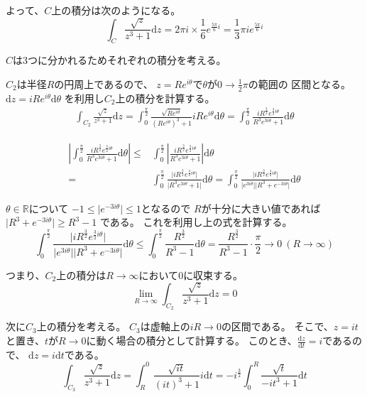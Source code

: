 \documentclass[12pt,b5paper]{ltjsarticle}
\begin{document}
よって、$C$上の積分は次のようになる。
\begin{equation}
 \int_{C} \frac{\sqrt{z}}{z^3+1}\mathrm{d}z
  = 2\pi i \times \frac{1}{6} e^{\frac{5\pi}{6}i}
  = \frac{1}{3} \pi i e^{\frac{5\pi}{6}i}
\end{equation}

$C$は3つに分かれるためそれぞれの積分を考える。

$C_2$は半径$R$の円周上であるので、
$z=Re^{i\theta}$で$\theta$が$0\to \frac{1}{2}\pi$の範囲の
区間となる。
$\mathrm{d}z = iRe^{i\theta}\mathrm{d}\theta$
を利用し$C_2$上の積分を計算する。
\begin{align}
 \int_{C_2} \frac{\sqrt{z}}{z^3+1}\mathrm{d}z
 = \int_{0}^{\frac{\pi}{2}} \frac{\sqrt{Re^{i\theta}}}{(Re^{i\theta})^3+1} iRe^{i\theta}\mathrm{d}\theta
 = \int_{0}^{\frac{\pi}{2}} \frac{iR^{\frac{3}{2}}e^{\frac{3}{2}i\theta}}{R^3 e^{3i\theta}+1} \mathrm{d}\theta
\end{align}


\begin{align}
  \left\lvert \int_{0}^{\frac{\pi}{2}} \frac{iR^{\frac{3}{2}}e^{\frac{3}{2}i\theta}}{R^3 e^{3i\theta}+1} \mathrm{d}\theta \right\rvert
  \leq &
   \int_{0}^{\frac{\pi}{2}} \left\lvert \frac{iR^{\frac{3}{2}}e^{\frac{3}{2}i\theta}}{R^3 e^{3i\theta}+1}  \right\rvert \mathrm{d}\theta\\
   = &
   \int_{0}^{\frac{\pi}{2}}  \frac{\lvert iR^{\frac{3}{2}}e^{\frac{3}{2}i\theta} \rvert}{\lvert R^3 e^{3i\theta}+1 \rvert}   \mathrm{d}\theta
   =
   \int_{0}^{\frac{\pi}{2}}
   \frac{\lvert iR^{\frac{3}{2}}e^{\frac{3}{2}i\theta} \rvert}
   {\lvert e^{3i\theta} \rvert \lvert R^3 + e^{-3i\theta} \rvert}
   \mathrm{d}\theta
\end{align}

$\theta\in\mathbb{R}$について
$-1 \leq \lvert e^{-3i\theta} \rvert \leq 1$となるので
$R$が十分に大きい値であれば
$\lvert R^3 + e^{-3i\theta} \rvert \geq  R^3 -1$
である。
これを利用し上の式を計算する。
\begin{equation}
   \int_{0}^{\frac{\pi}{2}}
   \frac{\lvert iR^{\frac{3}{2}}e^{\frac{3}{2}i\theta} \rvert}
   {\lvert e^{3i\theta} \rvert \lvert R^3 + e^{-3i\theta} \rvert}
   \mathrm{d}\theta
   \leq
  \int_{0}^{\frac{\pi}{2}}\frac{R^{\frac{3}{2}}}{R^3-1}\mathrm{d}\theta
  = \frac{R^{\frac{3}{2}}}{R^3-1}\cdot\frac{\pi}{2}
  \to 0 \ (R\to\infty)
\end{equation}

つまり、$C_2$上の積分は$R\to\infty$において$0$に収束する。
\begin{equation}
 \lim_{R\to\infty}\int_{C_2} \frac{\sqrt{z}}{z^3+1}\mathrm{d}z=0
\end{equation}

次に$C_3$上の積分を考える。
$C_3$は虚軸上の$iR\to 0$の区間である。
そこで、$z=it$と置き、$t$が$R\to 0$に動く場合の積分として計算する。
このとき、$\frac{\mathrm{d}z}{\mathrm{d}t}=i$であるので、
$\mathrm{d}z=i\mathrm{d}t$である。
\begin{equation}
  \int_{C_3} \frac{\sqrt{z}}{z^3+1}\mathrm{d}z
   =
  \int_{R}^{0} \frac{\sqrt{it}}{(it)^3+1}i\mathrm{d}t
  =
  -i^{\frac{3}{2}} \int_{0}^{R} \frac{\sqrt{t}}{-it^3+1}\mathrm{d}t
\end{equation}




\hrulefill
\end{document}
